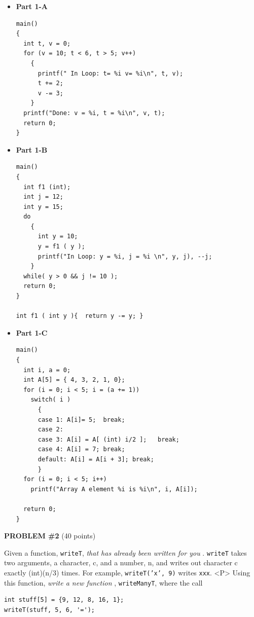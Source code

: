 \begin{itemize}
\item {\bf Part 1-A}

\begin{verbatim}
main()
{
  int t, v = 0;
  for (v = 10; t < 6, t > 5; v++)
    {
      printf(" In Loop: t= %i v= %i\n", t, v);  
      t += 2;
      v -= 3;
    }
  printf("Done: v = %i, t = %i\n", v, t);
  return 0;
}
\end{verbatim}

\pagebreak

\item {\bf Part 1-B}

\begin{verbatim}
main()
{
  int f1 (int);
  int j = 12;
  int y = 15;
  do
    {
      int y = 10;
      y = f1 ( y );
      printf("In Loop: y = %i, j = %i \n", y, j), --j;
    }
  while( y > 0 && j != 10 );
  return 0;
}

int f1 ( int y ){  return y -= y; }
\end{verbatim}

\pagebreak
\item {\bf Part 1-C}

\begin{verbatim}
main()
{
  int i, a = 0;
  int A[5] = { 4, 3, 2, 1, 0};
  for (i = 0; i < 5; i = (a += 1))
    switch( i )
      {
      case 1: A[i]= 5;  break;
      case 2: 
      case 3: A[i] = A[ (int) i/2 ];   break;
      case 4: A[i] = 7; break;
      default: A[i] = A[i + 3]; break;
      }
  for (i = 0; i < 5; i++)
    printf("Array A element %i is %i\n", i, A[i]); 

  return 0;
}
\end{verbatim}

\end{itemize}

\pagebreak

{\bf PROBLEM \#2} (40 points)

Given a function, {\tt writeT}, {\em that has already
been written for you } .  {\tt writeT} takes two arguments,
a character, c, and a number, n, and writes out character c exactly (int)(n/3)
times. For example, {\tt writeT('x', 9)} writes {\tt xxx}.
<P>
Using this function, {\em write a new function } , {\tt writeManyT},
where the call
\begin{verbatim}
int stuff[5] = {9, 12, 8, 16, 1};
writeT(stuff, 5, 6, '=');
\end{verbatim}

